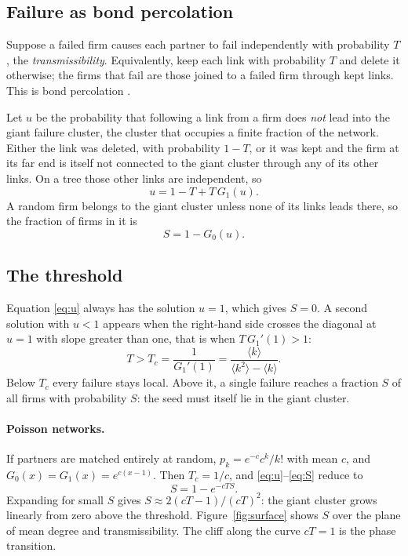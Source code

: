 \documentclass[11pt,a4paper]{article}
\theoremstyle{definition}
\theoremstyle{remark}
\newcommand{\avg}[1]{\langle #1 \rangle}
\begin{document}
\subsection{Failure as bond percolation}

Suppose a failed firm causes each partner to fail independently with probability $T$, the \emph{transmissibility}. Equivalently, keep each link with probability $T$ and delete it otherwise; the firms that fail are those joined to a failed firm through kept links. This is bond percolation \citep{Callaway2000}.

Let $u$ be the probability that following a link from a firm does \emph{not} lead into the giant failure cluster, the cluster that occupies a finite fraction of the network. Either the link was deleted, with probability $1-T$, or it was kept and the firm at its far end is itself not connected to the giant cluster through any of its other links. On a tree those other links are independent, so
\begin{equation}
u = 1 - T + T\,G_1(u).
\label{eq:u}
\end{equation}
A random firm belongs to the giant cluster unless none of its links leads there, so the fraction of firms in it is
\begin{equation}
S = 1 - G_0(u).
\label{eq:S}
\end{equation}

\subsection{The threshold}

Equation \eqref{eq:u} always has the solution $u=1$, which gives $S=0$. A second solution with $u<1$ appears when the right-hand side crosses the diagonal at $u=1$ with slope greater than one, that is when $T\,G_1'(1) > 1$:
\begin{equation}
T > T_c = \frac{1}{G_1'(1)} = \frac{\avg{k}}{\avg{k^2} - \avg{k}} .
\label{eq:Tc}
\end{equation}
Below $T_c$ every failure stays local. Above it, a single failure reaches a fraction $S$ of all firms with probability $S$: the seed must itself lie in the giant cluster.

\paragraph{Poisson networks.} If partners are matched entirely at random, $p_k = e^{-c} c^k / k!$ with mean $c$, and $G_0(x) = G_1(x) = e^{c(x-1)}$. Then $T_c = 1/c$, and \eqref{eq:u}--\eqref{eq:S} reduce to
\begin{equation}
S = 1 - e^{-cTS}.
\end{equation}
Expanding for small $S$ gives $S \approx 2(cT-1)/(cT)^2$: the giant cluster grows linearly from zero above the threshold. Figure~\ref{fig:surface} shows $S$ over the plane of mean degree and transmissibility. The cliff along the curve $cT = 1$ is the phase transition.
\end{document}
